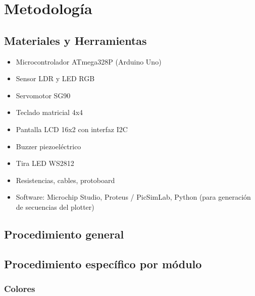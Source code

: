 \section{Metodología}

\subsection{Materiales y Herramientas}

\begin{itemize}
    \item Microcontrolador ATmega328P (Arduino Uno)
    \item Sensor LDR y LED RGB
    \item Servomotor SG90
    \item Teclado matricial 4x4
    \item Pantalla LCD 16x2 con interfaz I2C
    \item Buzzer piezoeléctrico
    \item Tira LED WS2812
    \item Resistencias, cables, protoboard
    \item Software: Microchip Studio, Proteus / PicSimLab, Python (para generación de secuencias del plotter)
\end{itemize}

\subsection{Procedimiento general}




\subsection{Procedimiento específico por módulo}

\subsubsection{Colores}


